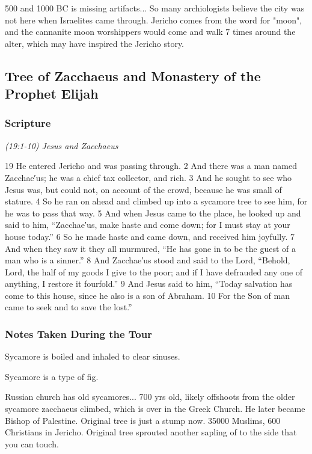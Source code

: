 \documentclass[letterpaper]{report}
\begin{document}
500 and 1000 BC is missing artifacts... So many archiologists believe the city was not here when Israelites came through.
Jericho comes from the word for "moon", and the cannanite moon worshippers would come and walk 7 times around the alter, which may have inspired the Jericho story.


\clearpage
\subsection{Tree of Zacchaeus and Monastery of the Prophet Elijah}
\begin{multicols}{2}
	\mbox{}
\end{multicols}
\subsubsection{Scripture}

{\centering
	\emph{(19:1-10) Jesus and Zacchaeus}\\
}
\begin{multicols}{2}
19 He entered Jericho and was passing through. 2 And there was a man named Zacchae′us; he was a chief tax collector, and rich. 3 And he sought to see who Jesus was, but could not, on account of the crowd, because he was small of stature. 4 So he ran on ahead and climbed up into a sycamore tree to see him, for he was to pass that way. 5 And when Jesus came to the place, he looked up and said to him, “Zacchae′us, make haste and come down; for I must stay at your house today.” 6 So he made haste and came down, and received him joyfully. 7 And when they saw it they all murmured, “He has gone in to be the guest of a man who is a sinner.” 8 And Zacchae′us stood and said to the Lord, “Behold, Lord, the half of my goods I give to the poor; and if I have defrauded any one of anything, I restore it fourfold.” 9 And Jesus said to him, “Today salvation has come to this house, since he also is a son of Abraham. 10 For the Son of man came to seek and to save the lost.”
\end{multicols}

\subsubsection{Notes Taken During the Tour}
\begin{multicols}{2}
Sycamore is boiled and inhaled  to clear sinuses.

Sycamore is a type of fig.

Russian church has old sycamores... 700 yrs old, likely offshoots from the older sycamore zacchaeus climbed, which is over in the Greek Church.
He later became Bishop of Palestine.
Original tree is just a stump now.
35000 Muslims, 600 Christians in Jericho.
Original tree sprouted another sapling of to the side that you can touch.
\end{multicols}
\end{document}
